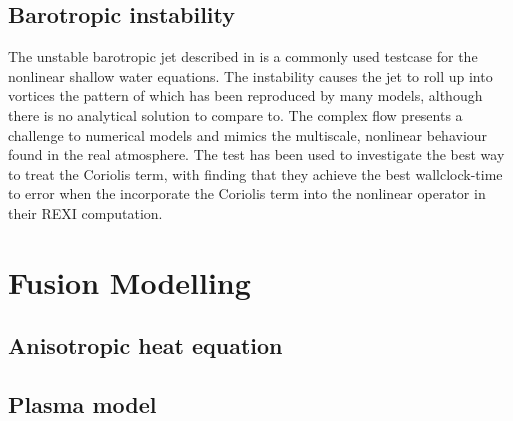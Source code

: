 \documentclass{article}
\begin{document}
\subsection{Barotropic instability}
The unstable barotropic jet described in \citet{galewsky2004initial}
is a commonly used testcase for the nonlinear shallow water
equations. The instability causes the jet to roll up into vortices the
pattern of which has been reproduced by many models, although there is
no analytical solution to compare to. The complex flow presents a
challenge to numerical models and mimics the multiscale, nonlinear
behaviour found in the real atmosphere. The test has been used to
investigate the best way to treat the Coriolis term, with
\citet{schreiber2019exponential} finding that they achieve the best
wallclock-time to error when the incorporate the Coriolis term into
the nonlinear operator in their REXI computation.

\section*{Fusion Modelling}

\subsection{Anisotropic heat equation}

\subsection{Plasma model}



\end{document}
